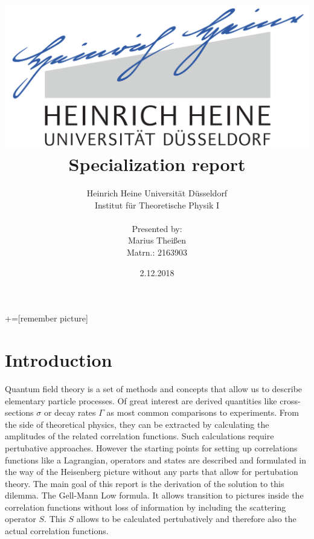 \documentclass[12pt, titlepage]{article}
\title{\includegraphics[scale=0.07]{logo}\\Specialization report}
\date{2.12.2018}
\author{ Heinrich Heine Universit\"at D\"usseldorf\\ Institut f\"ur Theoretische Physik I\\  \\Presented by:\\Marius Thei\ss{}en\\ Matrn.: 2163903 \\  }
\begin{document}
+=[remember picture]
\everymath{\displaystyle}

\maketitle %
\tableofcontents
\newpage
\section{Introduction}
Quantum field theory is a set of methods and concepts that allow us to describe elementary particle processes. Of great interest are derived quantities like cross-sections $ \sigma  $ or decay rates $ \Gamma $ as most common comparisons to experiments. From the side of theoretical physics, they can be extracted by calculating the amplitudes of the related correlation functions. Such calculations require pertubative approaches. However the starting points for setting up correlations functions like a Lagrangian, operators and states are described and formulated in the way of the Heisenberg picture without any parts that allow for pertubation theory. The main goal of this report is the derivation of the solution to this dilemma. The Gell-Mann Low formula. It allows transition to pictures inside the correlation functions without loss of information by including the scattering operator $ S $. This $ S $ allows to be calculated pertubatively and therefore also the actual correlation functions.  
\end{document}
